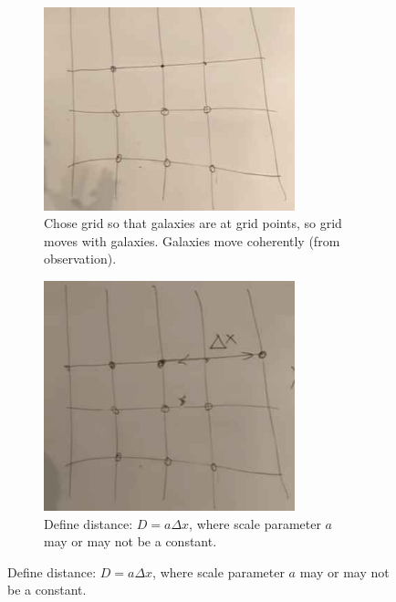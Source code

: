 \documentclass[]{article}
\begin{document}
\begin{figure}[H]
	\begin{center}
		\caption{We start by introducing a set of coordinates.}
		\begin{subfigure}[t]{0.45\textwidth}
			\caption{Chose grid so that galaxies are at grid points, so grid moves with galaxies. Galaxies move coherently (from observation).}\label{fig:cosmo-1-grid}
			\includegraphics[width=0.8\textwidth]{cosmo-1-grid}
		\end{subfigure}
		\;
		\begin{subfigure}[t]{0.45\textwidth}
			\caption{Define distance: $D=a\Delta x$, where scale parameter $a$ may or may not be a constant.}\label{fig:cosmo-1-distance}
			\includegraphics[width=0.8\textwidth]{cosmo-1-distance}
		\end{subfigure}
	\end{center}
\end{figure}
 
\end{document}
